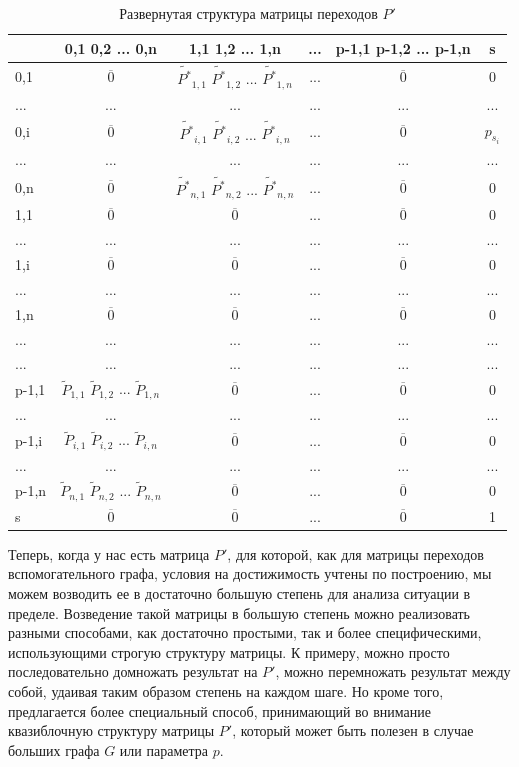 	\begin{table}[H]
		\begin{tabular}{l || c | c | c | c | c}
			& 0,1 0,2 ... 0,n & 1,1 1,2 ... 1,n & ... & p-1,1 p-1,2 ... p-1,n & s \\
			\hline \hline
			0,1 & $\overline 0$ & $\tilde{P^*}_{1,1}$ $\tilde{P^*}_{1,2}$ ... $\tilde{P^*}_{1,n}$ & ... & $\overline 0$ & 0 \\
			... & ... & ... & ... & ... & ... \\
			0,i & $\overline 0$ & $\tilde{P^*}_{i,1}$ $\tilde{P^*}_{i,2}$ ... $\tilde{P^*}_{i,n}$ & ... & $\overline 0$ & $p_{s_i}$ \\
			... & ... & ... & ... & ... & ... \\
			0,n & $\overline 0$ & $\tilde{P^*}_{n,1}$ $\tilde{P^*}_{n,2}$ ... $\tilde{P^*}_{n,n}$ & ... & $\overline 0$ & 0 \\
			\hline \hline
			1,1 & $\overline 0$ & $\overline 0$ & ... & $\overline 0$ & 0 \\
			... & ... & ... & ... & ... & ... \\
			1,i & $\overline 0$ & $\overline 0$ & ... & $\overline 0$ & 0 \\
			... & ... & ... & ... & ... & ... \\
			1,n & $\overline 0$ & $\overline 0$ & ... & $\overline 0$ & 0 \\
			\hline \hline
			... & ... & ... & ... & ... & ... \\
			... & ... & ... & ... & ... & ... \\
			\hline \hline
			p-1,1  & $\tilde{P}_{1,1}$ $\tilde{P}_{1,2}$ ... $\tilde{P}_{1,n}$ & $\overline 0$ & ... & $\overline 0$ & 0 \\
			... & ... & ... & ... & ... & ... \\
			p-1,i & $\tilde{P}_{i,1}$ $\tilde{P}_{i,2}$ ... $\tilde{P}_{i,n}$ & $\overline 0$ & ... & $\overline 0$ & 0 \\
			... & ... & ... & ... & ... & ... \\
			p-1,n & $\tilde{P}_{n,1}$ $\tilde{P}_{n,2}$ ... $\tilde{P}_{n,n}$ & $\overline 0$ & ... & $\overline 0$ & 0 \\
			\hline \hline
			s  & $\overline 0$ & $\overline 0$ & ... & $\overline 0$ & 1 \\
		\end{tabular}
		\caption{Развернутая структура матрицы переходов $P'$}
		\label{tabl:P'}
	\end{table}
	
	Теперь, когда у нас есть матрица $P'$, для которой, как для матрицы переходов вспомогательного графа, условия на достижимость учтены по построению, мы можем возводить ее в достаточно большую степень для анализа ситуации в пределе. Возведение такой матрицы в большую степень можно реализовать разными способами, как достаточно простыми, так и более специфическими, использующими строгую структуру матрицы. К примеру, можно просто последовательно домножать результат на $P'$, можно перемножать результат между собой, удаивая таким образом степень на каждом шаге. Но кроме того, предлагается более специальный способ, принимающий во внимание квазиблочную структуру матрицы $P'$, который может быть полезен в случае больших графа $G$ или параметра $p$.	
	
